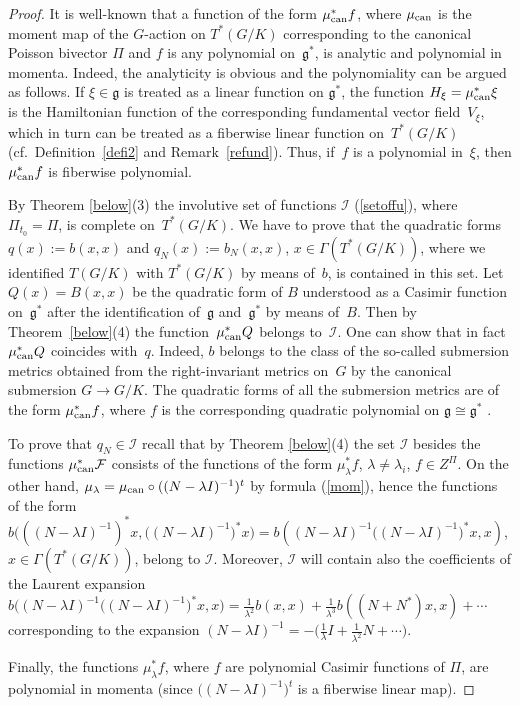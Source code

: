 \documentclass[10pt,a4paper]{amsart}
\numberwithin{equation}{section}
\begin{document}
\begin{proof} It is well-known that a function of the form $\mu_{\rm can}^*f$, where $\mu_{\rm can}$ is the moment map of the $G$-action on $T^*(G/K)$ corresponding to the canonical Poisson bivector $\Pi$ and $f$ is any polynomial on~$\mathfrak{g}^*$, is analytic and polynomial in momenta. Indeed, the analyticity is obvious and the polynomiality can be argued as follows. If $\xi\in\mathfrak{g}$ is treated as a linear function on $\mathfrak{g}^*$, the function $H_\xi=\mu_{\rm can}^*\xi$ is the Hamiltonian function of the corresponding fundamental vector field~$V_\xi$, which in turn can be treated as a fiberwise linear function on~$T^*(G/K)$ (cf.\ Definition~\ref{defi2} and Remark~\ref{refund}). Thus, if~$f$ is a polynomial in~$\xi$, then $\mu_{\rm can}^*f$ is fiberwise polynomial.

By Theorem \ref{below}(3) the involutive set of functions $\mathcal{I}$ (\ref{setoffu}), where $\Pi_{t_0}=\Pi$, is complete on~$T^*(G/K)$. We have to prove that the quadratic forms $q(x):=b(x,x)$ and $q_N(x):=b_N(x,x)$, $x\in \Gamma(T^*(G/K))$, where we identified $T(G/K)$ with $T^*(G/K)$ by means of~$b$, is contained in this set. Let $Q(x)=B(x,x)$ be the quadratic form of $B$ understood as a Casimir function on~$\mathfrak{g}^*$ after the identification of~$\mathfrak{g}$ and~$\mathfrak{g}^*$ by means of~$B$. Then by Theorem~\ref{below}(4) the function~$\mu_{\rm can}^*Q$ belongs to~$\mathcal{I}$. One can show that in fact $\mu_{\rm can}^*Q$ coincides with~$q$. Indeed, $b$ belongs to the class of the so-called submersion metrics obtained from the right-invariant metrics on~$G$ by the canonical submersion $G\to G/K$. The quadratic forms of all the submersion metrics are of the form $\mu_{\rm can}^*f$, where $f$ is the corresponding quadratic polynomial on $\mathfrak{g}\cong\mathfrak{g}^*$ \cite[Section~7]{bjObzor}.

To prove that $q_N\in \mathcal{I}$ recall that by Theorem \ref{below}(4) the set $\mathcal{I}$ besides the functions $\mu_{\rm can}^*\mathcal{F}$ consists of the functions of the form $\mu_\lambda^*f$, $\lambda\not=\lambda_i$, $f\in Z^\Pi$. On the other hand, $\mu_\lambda=\mu_{\rm can}\circ((N-\lambda I)^{-1})^t$ by formula (\ref{mom}), hence the functions of the form $b\big(((N-\lambda I)^{-1})^*x,\big((N-\lambda I)^{-1}\big)^*x\big)=b((N-\lambda I)^{-1}\big((N-\lambda I)^{-1}\big)^*x,x)$, $x\in \Gamma(T^*(G/K))$, belong to $\mathcal{I}$. Moreover, $\mathcal{I}$ will contain also the coefficients of the Laurent expansion $b\big((N-\lambda I)^{-1}\big((N-\lambda I)^{-1}\big)^*x,x\big)=\frac1{\lambda^2}b(x,x)+\frac1{\lambda^3}b((N+N^*)x,x)+\cdots$ corresponding to the expansion $(N-\lambda I)^{-1}=-\big(\frac1{\lambda}I +\frac1{\lambda^2}N+\cdots\big)$.

Finally, the functions $\mu_\lambda^*f$, where $f$ are polynomial Casimir functions of $\Pi$, are polynomial in momenta (since $\big((N-\lambda I)^{-1}\big)^t$ is a fiberwise linear map).
\end{proof}
\end{document}
